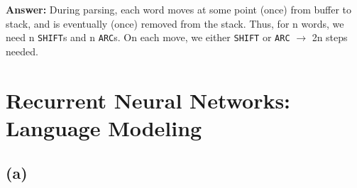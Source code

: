 \documentclass[11pt]{article}
\begin{document}
\textbf{Answer:} During parsing, each word moves at some point (once) from buffer to stack, and is eventually (once) removed from the stack. Thus, for n words, we need n \verb|SHIFT|s and n \verb|ARC|s. On each move, we either \verb|SHIFT| or \verb|ARC| $\to$ 2n steps needed.

\section{Recurrent Neural Networks: Language Modeling}
\subsection*{(a)}
\end{document}
